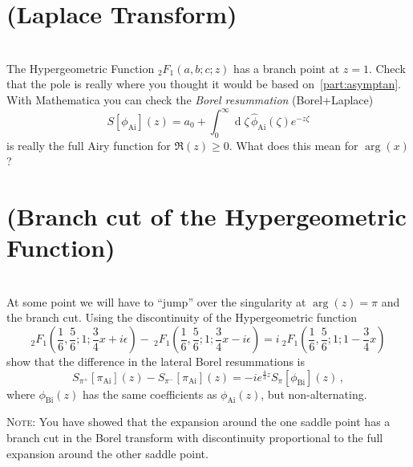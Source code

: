 \documentclass{exam}
\DeclareMathOperator{\diff}{d}
\DeclareMathOperator*{\Ai}{Ai}
\DeclareMathOperator*{\Bi}{Bi}
\begin{document}
\begin{questions}
\begin{parts}
            \part{(\textbf{Laplace Transform})}\\
            The Hypergeometric Function $_2F_1(a,b;c;z)$ has a branch point at $z=1$.
            Check that the pole is really where you thought it would be based on~\ref{part:asymptan}.
            With Mathematica you can check the \emph{Borel resummation} (Borel+Laplace)
            \begin{equation}
            S[\phi_{\Ai}](z) = a_0 + \int_0^\infty \diff\! \zeta\, \hat{\phi}_{\Ai} (\zeta) e^{-z\zeta}
            \end{equation}
            is really the full Airy function for $\Re(z)\geq 0$.
            What does this mean for $\arg(x)$? 

            \part{(Branch cut of the Hypergeometric Function)}\\
            At some point we will have to ``jump'' over the singularity at $\arg(z) = \pi$ and the branch cut.
            Using the discontinuity of the Hypergeometric function
            \begin{equation}
                _2F_1\left( \frac{1}{6}, \frac{5}{6};1 ; \frac{3}{4}x + i \epsilon \right) -
                ~_2F_1\left( \frac{1}{6}, \frac{5}{6};1 ; \frac{3}{4}x - i \epsilon \right)
                 = i~_2F_1\left( \frac{1}{6},\frac{5}{6}; 1; 1 - \frac{3}{4} x \right)
            \end{equation}
            show that the difference in the lateral Borel resummations is
            \begin{equation}
                S_{\pi^+}[\pi_{\Ai}](z) - S_{\pi^-}[\pi_{\Ai}](z) = - i e^{\frac{4}{3} z}S_\pi[\phi_{\Bi}](z)\,,
            \end{equation}
            where $\phi_{\Bi}(z)$ has the same coefficients as $\phi_{\Ai}(z)$, but non-alternating.
            
            \textsc{Note}: You have showed that the expansion around the one saddle point has a branch cut
            in the Borel transform with discontinuity proportional to the full expansion around the 
            other saddle point.
            
            
            

            
            
            
        \end{parts}
        
\end{questions}
\end{document}
